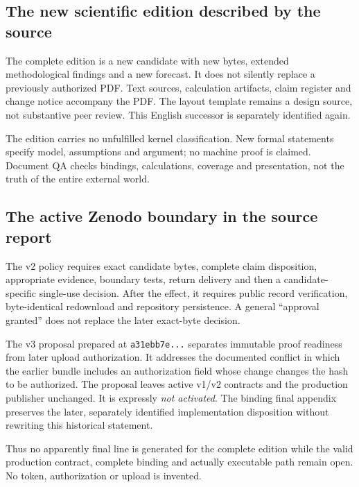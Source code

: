 \begin{cols}
\subsection*{The new scientific edition described by the source}
The complete edition is a new candidate with new bytes, extended methodological findings and a new forecast. It does not silently replace a previously authorized PDF. Text sources, calculation artifacts, claim register and change notice accompany the PDF. The layout template remains a design source, not substantive peer review. This English successor is separately identified again.

The edition carries no unfulfilled kernel classification. New formal statements specify model, assumptions and argument; no machine proof is claimed. Document QA checks bindings, calculations, coverage and presentation, not the truth of the entire external world.

\subsection*{The active Zenodo boundary in the source report}
The v2 policy requires exact candidate bytes, complete claim disposition, appropriate evidence, boundary tests, return delivery and then a candidate-specific single-use decision. After the effect, it requires public record verification, byte-identical redownload and repository persistence. A general ``approval granted'' does not replace the later exact-byte decision. 

The v3 proposal prepared at \texttt{a31ebb7e...} separates immutable proof readiness from later upload authorization. It addresses the documented conflict in which the earlier bundle includes an authorization field whose change changes the hash to be authorized. The proposal leaves active v1/v2 contracts and the production publisher unchanged. It is expressly \emph{not activated}. The binding final appendix preserves the later, separately identified implementation disposition without rewriting this historical statement. 

Thus no apparently final  line is generated for the complete edition while the valid production contract, complete binding and actually executable path remain open. No token, authorization or upload is invented.


\end{cols}
